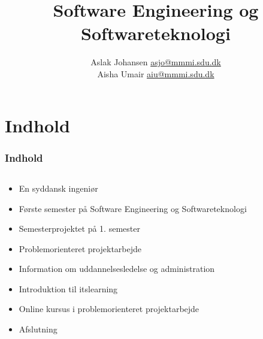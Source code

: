 \documentclass[t, aspectratio=169]{beamer}
\title{Software Engineering og Softwareteknologi \\ \scalebox{0.9}{Introduktion til Semesteret}}
\author{
Aslak Johansen \hspace{1mm} \href{mailto:asjo@mmmi.sdu.dk}{asjo@mmmi.sdu.dk} \\
Aisha Umair \hspace{1mm} \href{mailto:aiu@mmmi.sdu.dk}{aiu@mmmi.sdu.dk}
}
\begin{document}
\frame{\titlepage}
\logo{}

\section{Indhold}
\begin{frame}[fragile]
  \frametitle{Indhold}
  \vspace{2mm}
  \begin{columns}
    \begin{column}{0.55\textwidth}
      \begin{itemize}
        \item En syddansk ingeniør
        \item Første semester på Software Engineering og Softwareteknologi
        \item Semesterprojektet på 1. semester
        \item Problemorienteret projektarbejde
        \item Information om uddannelsesledelse og administration
        \item Introduktion til itslearning
        \item Online kursus i problemorienteret projektarbejde
        \item Afslutning
      \end{itemize}
    \end{column}
    \begin{column}{0.45\textwidth}
    \end{column}
  \end{columns}
  

\end{frame}
\end{document}
